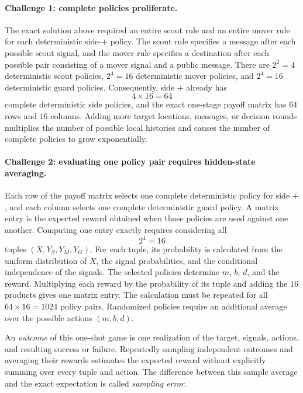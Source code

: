 \paragraph{Challenge 1: complete policies proliferate.}
The exact solution above required an entire scout rule and an entire mover rule for each deterministic side-$+$ policy. The scout rule specifies a message after each possible scout signal, and the mover rule specifies a destination after each possible pair consisting of a mover signal and a public message. There are $2^2=4$ deterministic scout policies, $2^4=16$ deterministic mover policies, and $2^4=16$ deterministic guard policies. Consequently, side $+$ already has
\[
    4\times16=64
\]
complete deterministic side policies, and the exact one-stage payoff matrix has $64$ rows and $16$ columns. Adding more target locations, messages, or decision rounds multiplies the number of possible local histories and causes the number of complete policies to grow exponentially.

\paragraph{Challenge 2: evaluating one policy pair requires hidden-state averaging.}
Each row of the payoff matrix selects one complete deterministic policy for side $+$, and each column selects one complete deterministic guard policy. A matrix entry is the expected reward obtained when those policies are used against one another. Computing one entry exactly requires considering all
\[
    2^4=16
\]
tuples $(X,Y_S,Y_M,Y_G)$. For each tuple, its probability is calculated from the uniform distribution of $X$, the signal probabilities, and the conditional independence of the signals. The selected policies determine $m$, $b$, $d$, and the reward. Multiplying each reward by the probability of its tuple and adding the $16$ products gives one matrix entry. The calculation must be repeated for all $64\times16=1024$ policy pairs. Randomized policies require an additional average over the possible actions $(m,b,d)$.

An \emph{outcome} of this one-shot game is one realization of the target, signals, actions, and resulting success or failure. Repeatedly sampling independent outcomes and averaging their rewards estimates the expected reward without explicitly summing over every tuple and action. The difference between this sample average and the exact expectation is called \emph{sampling error}.

